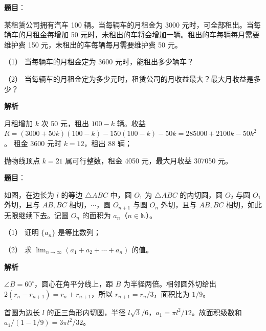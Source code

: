 \begin{answer}

\textbf{题目}：

某租赁公司拥有汽车 100 辆。当每辆车的月租金为 3000 元时，可全部租出。当每辆车的月租金每增加 50 元时，未租出的车将会增加一辆。租出的车每辆每月需要维护费 150 元，未租出的车每辆每月需要维护费 50 元。

（1） 当每辆车的月租金定为 3600 元时，能租出多少辆车？

（2） 当每辆车的月租金定为多少元时，租赁公司的月收益最大？最大月收益是多少？

\textbf{解析}


月租增加 $k$ 次 50 元，租出 $100-k$ 辆。收益 $R=(3000+50k)(100-k)-150(100-k)-50k=285000+2100k-50k^2$。 租金 3600 元时 $k=12$，租出 88 辆；


抛物线顶点 $k=21$ 属可行整数，租金 4050 元，最大月收益 307050 元。



\end{answer}
\begin{answer}

\textbf{题目}：

如图，在边长为 $l$ 的等边 $\triangle ABC$ 中，圆 $O_1$ 为 $\triangle ABC$ 的内切圆，圆 $O_2$ 与圆 $O_1$ 外切，且与 $AB,BC$ 相切，$\cdots$，圆 $O_{n+1}$ 与圆 $O_n$ 外切，且与 $AB,BC$ 相切，如此无限继续下去。记圆 $O_n$ 的面积为 $a_n$（$n\in\mathbb N$）。

（1） 证明 $\{a_n\}$ 是等比数列；

（2） 求 $\lim_{n\to\infty}(a_1+a_2+\cdots+a_n)$ 的值。
\nopagebreak[4]
\begin{center}\end{center}
\nopagebreak[4]
\textbf{解析}


$\angle B=60^\circ$，圆心在角平分线上，距 $B$ 为半径两倍。相邻圆外切给出 $2(r_n-r_{n+1})=r_n+r_{n+1}$，所以 $r_{n+1}=r_n/3$，面积比为 $1/9$。


首圆为边长 $l$ 的正三角形内切圆，半径 $l\sqrt3/6$，$a_1=\pi l^2/12$。故面积级数和 $a_1/(1-1/9)=3\pi l^2/32$。



\end{answer}
